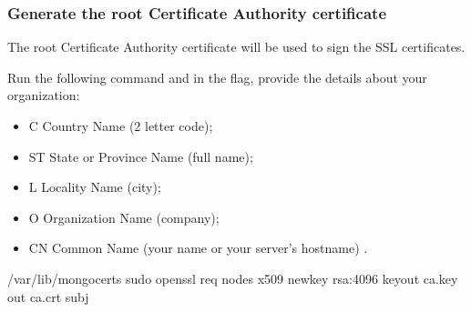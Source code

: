 \documentclass[letterpaper,10pt,english]{sphinxmanual}
\begin{document}
\subsubsection{Generate the root Certificate Authority certificate}
\label{\detokenize{x509-ldap:generate-the-root-certificate-authority-certificate}}
\sphinxAtStartPar
The root Certificate Authority certificate will be used to sign the SSL certificates.

\sphinxAtStartPar
Run the following command and in the  flag, provide the details about your organization:
\begin{itemize}
\item {} 
\sphinxAtStartPar
C \sphinxhyphen{} Country Name (2 letter code);

\item {} 
\sphinxAtStartPar
ST \sphinxhyphen{} State or Province Name (full name);

\item {} 
\sphinxAtStartPar
L \sphinxhyphen{} Locality Name (city);

\item {} 
\sphinxAtStartPar
O \sphinxhyphen{} Organization Name (company);

\item {} 
\sphinxAtStartPar
CN \sphinxhyphen{} Common Name (your name or your server’s hostname) .

\end{itemize}

\begin{sphinxVerbatim}[commandchars=\\\{\}]
\PYGZdl{}  /var/lib/mongocerts
\PYGZdl{} sudo openssl req \PYGZhy{}nodes \PYGZhy{}x509 \PYGZhy{}newkey rsa:4096 \PYGZhy{}keyout ca.key \PYGZhy{}out ca.crt \PYGZhy{}subj 
\end{sphinxVerbatim}
\end{document}
